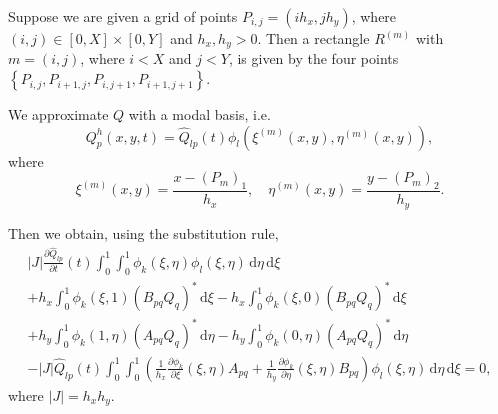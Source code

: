 \documentclass[a4paper]{scrartcl}
\newcommand{\dd}[1]{\,\mathrm{d}#1}
\begin{document}
Suppose we are given a grid of points
$P_{i,j} = \left(ih_x, jh_y\right)$, where $(i,j) \in [0,X]\times [0,Y]$ and $h_x,h_y > 0$.
Then a rectangle $R^{(m)}$ with $m=(i,j)$, where $i < X$ and $j < Y$, is given by the four points
$\left\{P_{i,j}, P_{i+1,j}, P_{i,j+1}, P_{i+1,j+1}\right\}$. 

We approximate $Q$ with a modal basis, i.e.
\begin{equation}
 Q_p^h(x,y,t) = \hat{Q}_{lp}\left(t\right)\phi_l\left(\xi^{(m)}(x,y), \eta^{(m)}(x,y)\right),
\end{equation}
where
\begin{equation}
 \xi^{(m)}(x,y) = \frac{x-(P_m)_1}{h_x}, \quad
 \eta^{(m)}(x,y) = \frac{y-(P_m)_2}{h_y}.
\end{equation}

Then we obtain, using the substitution rule,
\begin{multline}
 |J|\frac{\partial \hat{Q}_{lp}}{\partial t}(t)\int_{0}^{1}\int_{0}^{1}\phi_k(\xi,\eta)\phi_l(\xi,\eta)\dd{\eta}\dd{\xi} \\
 + h_x\int_{0}^{1}\phi_k(\xi,1)\left(B_{pq}Q_q\right)^* \dd{\xi} - h_x\int_{0}^{1}\phi_k(\xi,0)\left(B_{pq}Q_q\right)^* \dd{\xi} \\
 + h_y\int_{0}^{1}\phi_k(1,\eta)\left(A_{pq}Q_q\right)^* \dd{\eta} - h_y\int_{0}^{1}\phi_k(0,\eta)\left(A_{pq}Q_q\right)^* \dd{\eta} \\
 - |J|\hat{Q}_{lp}(t)\int_{0}^{1}\int_{0}^{1}\left(\frac{1}{h_x}\frac{\partial \phi_k}{\partial \xi}(\xi,\eta)A_{pq} + \frac{1}{h_y}\frac{\partial \phi_k}{\partial \eta}(\xi,\eta)B_{pq}\right)\phi_l(\xi,\eta)\dd{\eta}\dd{\xi} = 0,
\end{multline}
where $|J|=h_xh_y$.
\end{document}

